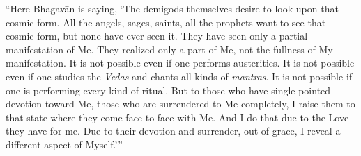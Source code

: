 \enquote{Here Bhagavān is saying, \enquote{The demigods themselves desire to look upon that cosmic form. All the angels, sages, saints, all the prophets want to see that cosmic form, but none have ever seen it. They have seen only a partial manifestation of Me. They realized only a part of Me, not the fullness of My manifestation. It is not possible even if one performs austerities. It is not possible even if one studies the \textit{Vedas} and chants all kinds of \textit{mantras}. It is not possible if one is performing every kind of ritual. But to those who have single-pointed devotion toward Me, those who are surrendered to Me completely, I raise them to that state where they come face to face with Me. And I do that due to the Love they have for me. Due to their devotion and surrender, out of grace, I reveal a different aspect of Myself.}}